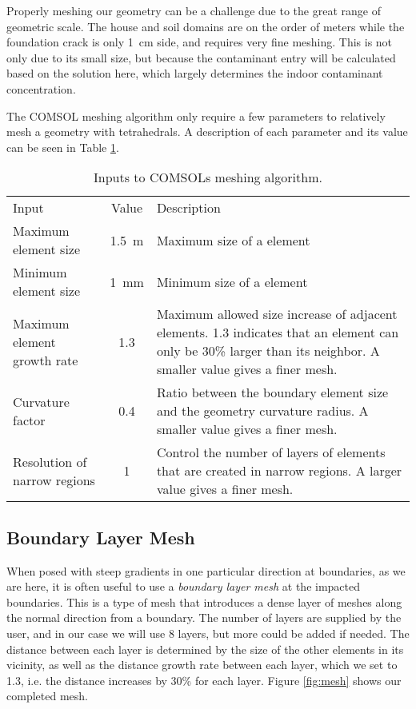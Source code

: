 Properly meshing our geometry can be a challenge due to the great range of geometric scale.
The house and soil domains are on the order of meters while the foundation crack is only \SI{1}{\centi\meter} side, and requires very fine meshing.
This is not only due to its small size, but because the contaminant entry will be calculated based on the solution here, which largely determines the indoor contaminant concentration.\par

The COMSOL meshing algorithm only require a few parameters to relatively mesh a geometry with tetrahedrals.
A description of each parameter and its value can be seen in Table \ref{tbl:meshing}.
\begin{table}[htb!]
  \caption{Inputs to COMSOLs meshing algorithm.}
  \label{tbl:meshing}
  \begin{tabularx}{\linewidth}{l c X}
    \toprule
    Input & Value & Description \\
    Maximum element size & \SI{1.5}{\metre} & Maximum size of a element \\
    Minimum element size & \SI{1}{\milli\metre} & Minimum size of a element \\
    Maximum element growth rate & 1.3 & Maximum allowed size increase of adjacent elements. 1.3 indicates that an element can only be 30\% larger than its neighbor. A smaller value gives a finer mesh. \\
    Curvature factor & 0.4 & Ratio between the boundary element size and the geometry curvature radius. A smaller value gives a finer mesh. \\
    Resolution of narrow regions & 1 & Control the number of layers of elements that are created in narrow regions. A larger value gives a finer mesh. \\
    \bottomrule
  \end{tabularx}
\end{table}

\subsection{Boundary Layer Mesh}

When posed with steep gradients in one particular direction at boundaries, as we are here, it is often useful to use a \textit{boundary layer mesh} at the impacted boundaries.
This is a type of mesh that introduces a dense layer of meshes along the normal direction from a boundary.
The number of layers are supplied by the user, and in our case we will use 8 layers, but more could be added if needed.
The distance between each layer is determined by the size of the other elements in its vicinity, as well as the distance growth rate between each layer, which we set to 1.3, i.e. the distance increases by 30\% for each layer.
Figure \ref{fig:mesh} shows our completed mesh.\par

